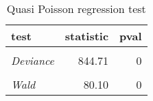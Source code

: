 \begin{table}

\caption{\label{tab:quasipoisson_reg_tests}Quasi Poisson regression test}
\centering
\begin{tabular}[t]{>{}lrr}
\toprule
test & statistic & pval\\
\midrule
\em{\cellcolor{gray!6}{Pearson}} & \cellcolor{gray!6}{2279.87} & \cellcolor{gray!6}{0}\\
\em{Deviance} & 844.71 & 0\\
\em{\cellcolor{gray!6}{LR}} & \cellcolor{gray!6}{67.65} & \cellcolor{gray!6}{0}\\
\em{Wald} & 80.10 & 0\\
\bottomrule
\end{tabular}
\end{table}
